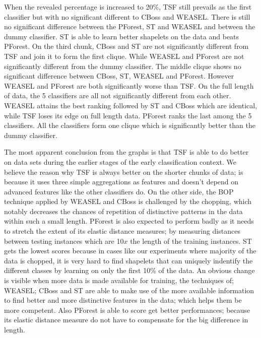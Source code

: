 When the revealed percentage is increased to 20\%, TSF still prevails as the first classifier but with no significant different to CBoss and WEASEL.
There is still no significant difference between the PForest, ST and WEASEL and between the dummy classifier.
ST is able to learn better shapelets on the data and beats PForest.
On the third chunk, CBoss and ST are not significantly different from TSF and join it to form the first clique.
While WEASEL and PForest are not significantly different from the dummy classifier.
The middle clique shows no significant difference between CBoss, ST, WEASEL and PForest. However WEASEL and PForest are both significantly worse than TSF.
On the full length of data, the 5 classifiers are all not significantly different from each other.
WEASEL attains the best ranking followed by ST and CBoss which are identical, while TSF loses its edge on full length data.
PForest ranks the last among the 5 classifiers. All the classifiers form one clique which is significantly better than the dummy classifier.

The most apparent conclusion from the graphs is that TSF is able to do better on data sets during the earlier stages of the early classification context.
We believe the reason why TSF is always better on the shorter chunks of data; is because it uses three simple aggregations as features and doesn't depend on advanced features like the other classifiers do.
On the other side, the BOP technique applied by WEASEL and CBoss is challenged by the chopping, which notably decreases the chances of repetition of distinctive patterns in the data within such a small length.
PForest is also expected to perform badly as it needs to stretch the extent of its elastic distance measures; by measuring distances between testing instances which are 10$x$ the length of the training instances.
ST gets the lowest scores because in cases like our experiments where majority of the data is chopped, it is very hard to find shapelets that can uniquely indentify the different classes by learning on only the first 10\% of the data.
An obvious change is visible when more data is made available for training, the techniques of; WEASEL; CBoss and ST are able to make use of the more available information
to find better and more distinctive features in the data; which helps them be more competent.
Also PForest is able to score get better performances; because its elastic distance measure do not have to compensate for the big difference in length.


